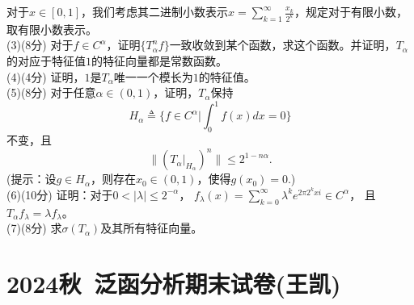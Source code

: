 \begin{enumerate}
    对于$x\in[0,1]$，我们考虑其二进制小数表示$\displaystyle x=\sum_{k=1}^\infty \frac{x_k}{2^k}$，规定对于有限小数，取有限小数表示。\\
    (3)(8分) 对于$f\in C^\alpha$，证明$\{T_\alpha^n f\}$一致收敛到某个函数，求这个函数。并证明，$T_\alpha$的对应于特征值$1$的特征向量都是常数函数。\\
    (4)(4分) 证明，$1$是$T_\alpha$唯一一个模长为$1$的特征值。\\
    (5)(8分) 对于任意$\alpha\in(0,1)$，证明，$T_\alpha$保持
    \[H_\alpha\triangleq\Big\{f\in C^\alpha\Big|\int_0^1 f(x) dx=0\Big\}\]
    不变，且
    \[\|(T_\alpha|_{H_\alpha})^n\|\leqslant2^{1-n\alpha}.\]
    (提示：设$g\in H_\alpha$，则存在$x_0\in(0,1)$，使得$g(x_0)=0$.)\\
    (6)(10分) 证明：对于$0<|\lambda|\leqslant2^{-\alpha}$，
    $\displaystyle f_\lambda(x)=\sum_{k=0}^\infty \lambda^ke^{2\pi2^kxi}\in C^\alpha$，
    且$T_\alpha f_\lambda=\lambda f_\lambda$。\\
    (7)(8分) 求$\sigma(T_\alpha)$及其所有特征向量。
\end{enumerate}

\section{2024秋\ 泛函分析期末试卷(王凯)}

